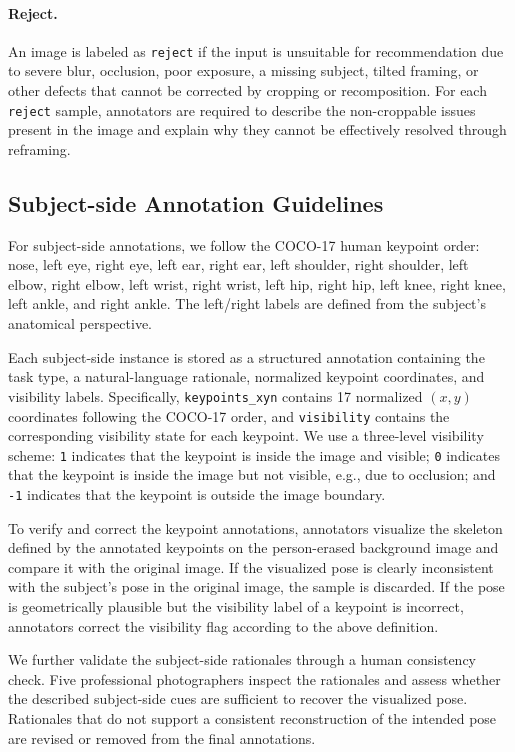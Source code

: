 \documentclass{article} %
\begin{document}
\paragraph{Reject.}
An image is labeled as \texttt{reject} if the input is unsuitable for recommendation due to severe blur, occlusion, poor exposure, a missing subject, tilted framing, or other defects that cannot be corrected by cropping or recomposition. For each \texttt{reject} sample, annotators are required to describe the non-croppable issues present in the image and explain why they cannot be effectively resolved through reframing.
\subsection{Subject-side Annotation Guidelines}
\label{app:subject_guidelines}

For subject-side annotations, we follow the COCO-17 human keypoint order: nose, left eye, right eye, left ear, right ear, left shoulder, right shoulder, left elbow, right elbow, left wrist, right wrist, left hip, right hip, left knee, right knee, left ankle, and right ankle. The left/right labels are defined from the subject's anatomical perspective.

Each subject-side instance is stored as a structured annotation containing the task type, a natural-language rationale, normalized keypoint coordinates, and visibility labels. Specifically, \texttt{keypoints\_xyn} contains 17 normalized $(x,y)$ coordinates following the COCO-17 order, and \texttt{visibility} contains the corresponding visibility state for each keypoint. We use a three-level visibility scheme: \texttt{1} indicates that the keypoint is inside the image and visible; \texttt{0} indicates that the keypoint is inside the image but not visible, e.g., due to occlusion; and \texttt{-1} indicates that the keypoint is outside the image boundary.

To verify and correct the keypoint annotations, annotators visualize the skeleton defined by the annotated keypoints on the person-erased background image and compare it with the original image. If the visualized pose is clearly inconsistent with the subject's pose in the original image, the sample is discarded. If the pose is geometrically plausible but the visibility label of a keypoint is incorrect, annotators correct the visibility flag according to the above definition.

We further validate the subject-side rationales through a human consistency check. Five professional photographers inspect the rationales and assess whether the described subject-side cues are sufficient to recover the visualized pose. Rationales that do not support a consistent reconstruction of the intended pose are revised or removed from the final annotations.
\end{document}
